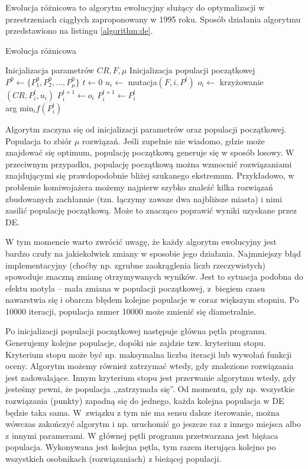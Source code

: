 \documentclass[a4paper,onecolumn,oneside,11pt,wide,floatssmall]{mwrep}
\theoremstyle{definition}
\theoremstyle{plain}%
\theoremstyle{remark}
\begin{document}
Ewolucja różnicowa to algorytm ewolucyjny służący do optymalizacji
w przestrzeniach ciągłych zaproponowany w 1995 roku. \cite{storn} Sposób działania algorytmu
przedstawiono na listingu \ref{algorithm:de}.

\begin{algorithm}[!htb]
\caption{Ewolucja różnicowa}
\label{algorithm:de}
\begin{algorithmic}[1]
\State Inicjalizacja parametrów $CR, F, \mu$
\State Inicjalizacja populacji początkowej $P^0 \gets \{P^0_1, P^0_2, \ldots, P^0_\mu\}$
\State $t \gets 0$
    \State $u_i \gets$ mutacja$(F, i, P^t)$
    \State $o_i \gets$ krzy{\.z}owanie$(CR, P_i^t, u_i)$
      \State $P_i^{t+1} \gets o_i$     
    \Else
      \State $P_i^{t+1} \gets P_i^{t}$
    \EndIf
  \EndFor
\EndWhile \\
\Return arg min$_i f(P^t_i)$
\end{algorithmic}
\end{algorithm}

Algorytm zaczyna się od inicjalizacji parametrów oraz populacji początkowej. 
Populacja to zbiór $\mu$ rozwiązań. 
Jeśli zupełnie nie wiadomo, gdzie może znajdować się optimum, 
populację początkową generuje się w sposób losowy. 
W przeciwnym przypadku, populację początkową można wzmocnić rozwiązaniami znajdującymi się 
prawdopodobnie bliżej szukanego ekstremum. 
Przykładowo, w problemie komiwojażera możemy najpierw szybko znaleźć kilka rozwiązań zbudowanych 
zachłannie (tzn. łączymy zawsze dwa najbliższe miasta) i nimi zasilić populację początkową. 
Może to znacząco poprawić wyniki uzyskane przez DE.

W tym momencie warto zwrócić uwagę, że każdy algorytm ewolucyjny jest bardzo czuły na jakiekolwiek 
zmiany w sposobie jego działania. 
Najmniejszy błąd implementacyjny 
(choćby np. zgrubne zaokrąglenia liczb rzeczywistych) 
spowoduje znaczną zmianę otrzymywanych wyników. 
Jest to sytuacja podobna do efektu motyla -- mała zmiana w populacji początkowej, 
z biegiem czasu nawarstwia się i obarcza błędem kolejne populacje w coraz większym stopniu. 
Po 10000 iteracji, populacja numer 10000 może zmienić się diametralnie.

Po inicjalizacji populacji początkowej następuje główna pętla programu. 
Generujemy kolejne populacje, dopóki nie zajdzie tzw. kryterium stopu. 
Kryterium stopu może być np. maksymalna liczba iteracji lub wywołań funkcji oceny.
 Algorytm możemy również zatrzymać wtedy, gdy znalezione rozwiązania jest zadowalające. 
Innym kryterium stopu jest przerwanie algorytmu wtedy, gdy jesteśmy pewni, 
że populacja ,,zatrzymała się''. 
Od momentu, gdy np. wszystkie rozwiązania (punkty) zapadną się do jednego, 
każda kolejna populacja w DE będzie taka sama. 
W związku z tym nie ma sensu dalsze iterowanie, 
można wówczas zakończyć algorytm i np. uruchomić go jeszcze raz z innego miejsca
albo z innymi paramerami.
W głównej pętli programu przetwarzana jest biężaca populacja. 
Wykonywana jest kolejna pętla, tym razem iterująca kolejno po wszystkich osobnikach 
(rozwiązaniach) z bieżącej populacji. 
\end{document}
